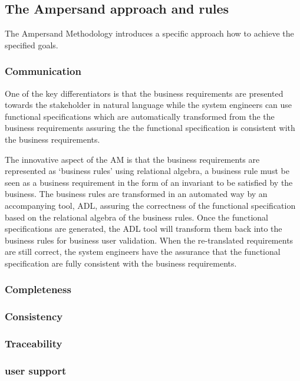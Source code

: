 \subsection{The Ampersand approach and rules}
%
The Ampersand Methodology introduces a specific approach how to achieve the specified goals. 

\subsubsection{Communication}

One of the key differentiators is that the business requirements are presented towards the stakeholder in natural language while the system engineers can use functional specifications which are automatically transformed from the the business requirements assuring the the functional specification is consistent with the business requirements.

The innovative aspect of the AM is that the business requirements are  represented as `business rules' using relational algebra, a business rule must be seen as a business requirement in the form of an invariant to be satisfied by the business. The business rules are transformed in an automated way by an accompanying tool, ADL, assuring the correctness of the functional specification based on the relational algebra of the business rules. Once the functional specifications are generated, the ADL tool will transform them back into the business rules for business user validation. When the re-translated requirements are still correct, the system engineers have the assurance that the functional specification are fully consistent with the business requirements. 

\subsubsection{Completeness}

\subsubsection{Consistency}

\subsubsection{Traceability}


\subsubsection{user support}




